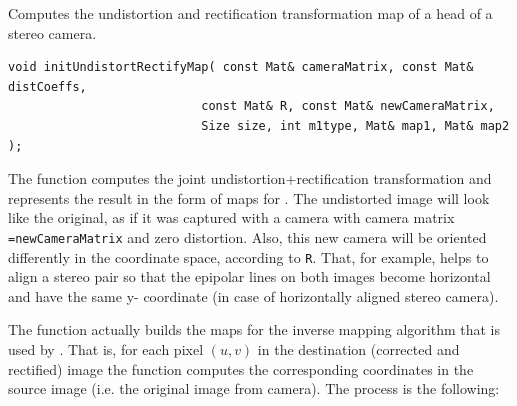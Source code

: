 \label{initUndistortRectifyMap}
Computes the undistortion and rectification transformation map of a head of a stereo camera.

\begin{lstlisting}
void initUndistortRectifyMap( const Mat& cameraMatrix, const Mat& distCoeffs,
                           const Mat& R, const Mat& newCameraMatrix,
                           Size size, int m1type, Mat& map1, Mat& map2 );
\end{lstlisting}
\begin{description}
\end{description}

The function computes the joint undistortion+rectification transformation and represents the result in the form of maps for . The undistorted image will look like the original, as if it was captured with a camera with camera matrix \texttt{=newCameraMatrix} and zero distortion. Also, this new camera will be oriented differently in the coordinate space, according to \texttt{R}. That, for example, helps to align a stereo pair so that the epipolar lines on both images become horizontal and have the same y- coordinate (in case of horizontally aligned stereo camera).

The function actually builds the maps for the inverse mapping algorithm that is used by . That is, for each pixel $(u, v)$ in the destination (corrected and rectified) image the function computes the corresponding coordinates in the source image (i.e. the original image from camera). The process is the following:

